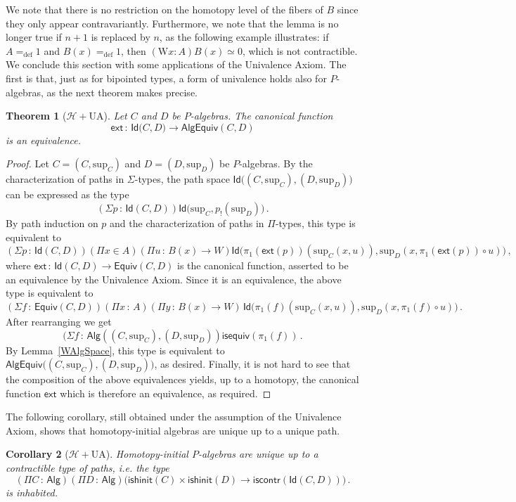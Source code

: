 \documentclass[10pt,a4paper,oneside,reqno]{amsart}
\theoremstyle{mythm}
\newtheorem{theorem}{Theorem}[section]
\newtheorem{corollary}[theorem]{Corollary}
\theoremstyle{mydef}
\theoremstyle{myrmk}
\newcommand{\defeq}{=_{\mathrm{def}}}
\newcommand{\co}{\,{:}\,}
\newcommand{\Hint}{\mathcal{H}}
\newcommand{\UA}{\mathrm{UA}}
\newcommand{\iscontr}{\mathsf{iscontr}}
\newcommand{\isequiv}{\mathsf{isequiv}}
\newcommand{\isalghinit}{\mathsf{ishinit}}
\newcommand{\ext}{\mathsf{ext}}
\newcommand{\Id}{\mathsf{Id}}
\newcommand{\W}{\mathrm{W}}
\newcommand{\Palg}{\mathsf{Alg}}
\renewcommand{\sup}{\mathrm{sup}}
\newcommand{\AlgEquiv}{\mathsf{AlgEquiv}}
\begin{document}
We note that there is no restriction on the homotopy level of the fibers of $B$ since they only appear contravariantly. Furthermore, we note that the lemma is no longer true if $n+1$ is replaced by $n$, as the following example
illustrates: if $A \defeq 1$ and $B(x) \defeq 1$, then $(\W x:A) B(x) \simeq 0$, which is not contractible. 
We conclude this section with some applications of the Univalence Axiom. The first is that, just as for bipointed 
types, a form of univalence holds also for $P$-algebras, as the next theorem makes precise. 


\begin{theorem}[$\Hint + \UA$] \label{thm:Punivalence}
Let $C$ and $D$ be $P$-algebras. The canonical function
\[ 
\ext \co \Id \big(C,D\big) \to  \AlgEquiv(C,D) 
\]
is an equivalence.
\end{theorem}

\begin{proof} 
Let $C = (C,\sup_C)$ and $D= (D,\sup_D)$ be $P$-algebras. By the characterization of paths in $\Sigma$-types, the path space 
$\Id \big( (C,\sup_C) ,  (D,\sup_D) \big)$ can be expressed as the type
\[
(\Sigma p \co \Id(C, D)) \Id \big( \sup_C ,  p_{!}(\sup_D)  \big) \, .
\]
By path induction on $p$ and the characterization of paths in $\Pi$-types, this type is equivalent to
\[  
(\Sigma p \co \Id(C,D))
(\Pi x \in A) 
(\Pi u \co B(x) \to W)
\Id \big(  \pi_1(\ext(p))( \sup_C(x,u)),  \sup_D(x, \pi_1(\ext (p)) \circ u) \big) \, , 
\]
where $\ext \co \Id(C,D) \to \mathsf{Equiv}(C,D)$ is the canonical function, asserted to be an equivalence by the Univalence Axiom. Since it is an equivalence, the above type is equivalent to
\[
(\Sigma f \co \mathsf{Equiv}(C,D)) 
(\Pi x  \co A) 
(\Pi y \co B(x) \to W) \, 
\Id \big( \pi_1(f) (\sup_C(x,u))  , \sup_D (x, \pi_1(f) \circ u) \big) \, .
\]
After rearranging we get
\[
(\Sigma f \co \Palg ( (C,\sup_C),  (D,\sup_D) ) \isequiv(\pi_1(f)) \, .
\]
By Lemma~\ref{WAlgSpace}, this type is equivalent to $\AlgEquiv \big( (C,\sup_C),  (D,\sup_D)\big)$, as desired. Finally, it is not hard to see that the composition of the above equivalences yields, up to a homotopy, the canonical function $\ext$ which is therefore an equivalence, as required.
\end{proof} 

The following corollary, still obtained under the assumption of the Univalence Axiom, shows that
homotopy-initial algebras are unique up to a unique path.

\begin{corollary}[$\Hint + \UA$] \label{WHInitIso}
Homotopy-initial $P$-algebras are unique up to a  contractible type of paths, i.e. the type
\[ 
(\Pi C \co \Palg) (\Pi D \co \Palg) \big( \isalghinit(C) \times \isalghinit(D)  \to 
\iscontr(\Id(C,D)) \big) \, .
\] 
is inhabited.
\end{corollary}
\end{document}
